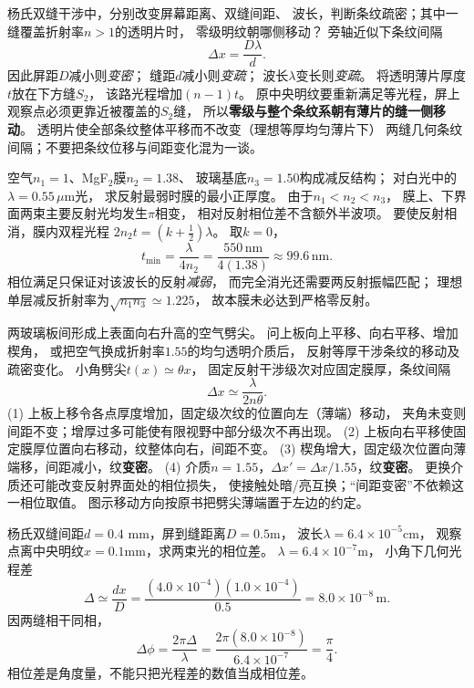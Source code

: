 
\problemtext 杨氏双缝干涉中，分别改变屏幕距离、双缝间距、
波长，判断条纹疏密；其中一缝覆盖折射率$n>1$的透明片时，
零级明纹朝哪侧移动？
\workings
旁轴近似下条纹间隔
\[
\boxed{\Delta x=\frac{D\lambda}{d}}.
\]
因此屏距$D$减小则\emph{变密}；
缝距$d$减小则\emph{变疏}；
波长$\lambda$变长则\emph{变疏}。
将透明薄片厚度$t$放在下方缝$S_2$，
该路光程增加$(n-1)t$。
原中央明纹要重新满足等光程，屏上观察点必须更靠近被覆盖的$S_2$缝，
所以\textbf{零级与整个条纹系朝有薄片的缝一侧移动}。
\crosscheck 透明片使全部条纹整体平移而不改变（理想等厚均匀薄片下）
两缝几何条纹间隔；不要把条纹位移与间距变化混为一谈。

\problemtext 空气$n_1=1$、MgF$_2$膜$n_2=1.38$、
玻璃基底$n_3=1.50$构成减反结构；
对白光中的$\lambda=0.55\,\mu$m光，
求反射最弱时膜的最小正厚度。
\workings
由于$n_1<n_2<n_3$，
膜上、下界面两束主要反射光均发生$\pi$相变，
相对反射相位差不含额外半波项。
要使反射相消，膜内双程光程
$2n_2t=(k+\tfrac12)\lambda$。
取$k=0$，
\[
\boxed{t_{\min}=\frac{\lambda}{4n_2}
=\frac{550\,\mathrm{nm}}{4(1.38)}
\approx99.6\,\mathrm{nm}}.
\]
\crosscheck 相位满足只保证对该波长的反射\emph{减弱}，
而完全消光还需要两反射振幅匹配；
理想单层减反折射率为$\sqrt{n_1n_3}\simeq1.225$，
故本膜未必达到严格零反射。

\problemtext 两玻璃板间形成上表面向右升高的空气劈尖。
问上板向上平移、向右平移、增加楔角，
或把空气换成折射率$1.55$的均匀透明介质后，
反射等厚干涉条纹的移动及疏密变化。
\workings
小角劈尖$t(x)\simeq\theta x$，
固定反射干涉级次对应固定膜厚，条纹间隔
\[
\boxed{\Delta x\simeq\frac{\lambda}{2n\theta}}.
\]
(1) 上板上移令各点厚度增加，固定级次纹的位置向左（薄端）移动，
夹角未变则间距不变；增厚过多可能使有限视野中部分级次不再出现。
(2) 上板向右平移使固定膜厚位置向右移动，纹整体向右，间距不变。
(3) 楔角增大，固定级次位置向薄端移，间距减小，纹\textbf{变密}。
(4) 介质$n=1.55$，$\Delta x'=\Delta x/1.55$，纹\textbf{变密}。
\crosscheck 更换介质还可能改变反射界面处的相位损失，
使接触处暗/亮互换；“间距变密”不依赖这一相位取值。
图示移动方向按原书把劈尖薄端置于左边的约定。

\problemtext 杨氏双缝间距$d=0.4$ mm，屏到缝距离$D=0.5$m，
波长$\lambda=6.4\times10^{-5}$cm，
观察点离中央明纹$x=0.1$mm，求两束光的相位差。
\workings
$\lambda=6.4\times10^{-7}$m，
小角下几何光程差
\[
\Delta \simeq\frac{dx}{D}
=\frac{(4.0\times10^{-4})(1.0\times10^{-4})}{0.5}
=8.0\times10^{-8}\,\mathrm m.
\]
因两缝相干同相，
\[
\boxed{\Delta\phi=\frac{2\pi\Delta}{\lambda}
=\frac{2\pi(8.0\times10^{-8})}{6.4\times10^{-7}}
=\frac{\pi}{4}}.
\]
\crosscheck 相位差是角度量，不能只把光程差的数值当成相位差。

